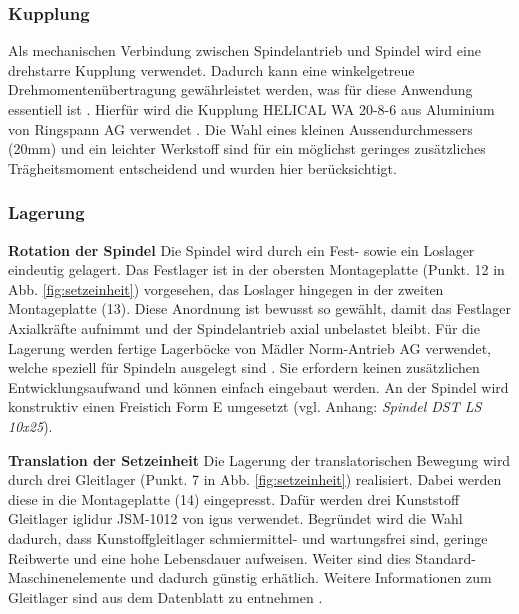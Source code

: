 \subsubsection{Kupplung}
Als mechanischen Verbindung zwischen Spindelantrieb und Spindel wird eine drehstarre Kupplung verwendet. Dadurch kann eine winkelgetreue Drehmomentenübertragung gewährleistet werden, was für diese Anwendung essentiell ist \cite{dubbel}. Hierfür wird die Kupplung HELICAL WA 20-8-6 aus Aluminium von Ringspann AG verwendet \cite{helical}. Die Wahl eines kleinen Aussendurchmessers (20mm) und ein leichter Werkstoff sind für ein möglichst geringes zusätzliches Trägheitsmoment entscheidend und wurden hier berücksichtigt.

\subsubsection{Lagerung}
\textbf{Rotation der Spindel}
\newline
Die Spindel wird durch ein Fest- sowie ein Loslager eindeutig gelagert. Das Festlager ist in der obersten Montageplatte (Punkt. 12 in Abb. \ref{fig:setzeinheit}) vorgesehen, das Loslager hingegen in der zweiten Montageplatte (13). Diese Anordnung ist bewusst so gewählt, damit das Festlager Axialkräfte aufnimmt und der Spindelantrieb axial unbelastet bleibt. Für die Lagerung werden fertige Lagerböcke von Mädler Norm-Antrieb AG verwendet, welche speziell für Spindeln ausgelegt sind \cite{maedler}. Sie erfordern keinen zusätzlichen Entwicklungsaufwand und können einfach eingebaut werden. An der Spindel wird konstruktiv einen Freistich Form E umgesetzt (vgl. Anhang: \textit{Spindel DST LS 10x25})\cite{vsm}.
\newline

\textbf{Translation der Setzeinheit}
\newline
Die Lagerung der translatorischen Bewegung wird durch drei Gleitlager (Punkt. 7 in Abb. \ref{fig:setzeinheit}) realisiert. Dabei werden diese in die Montageplatte (14) eingepresst. Dafür werden drei Kunststoff Gleitlager iglidur JSM-1012 von igus verwendet. Begründet wird die Wahl dadurch, dass Kunstoffgleitlager schmiermittel- und wartungsfrei sind, geringe Reibwerte und eine hohe Lebensdauer aufweisen. Weiter sind dies Standard-Maschinenelemente und dadurch günstig erhätlich. Weitere Informationen zum Gleitlager sind aus dem Datenblatt zu entnehmen \cite{igusJSM}.


